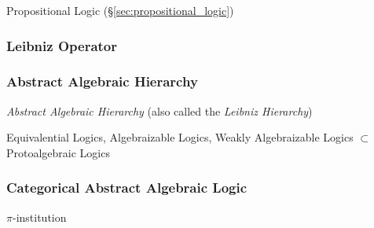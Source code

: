 Propositional Logic (\S\ref{sec:propositional_logic})



\subsubsection{Leibniz Operator}\label{sec:leibniz_operator}

\subsubsection{Abstract Algebraic Hierarchy}\label{sec:leibniz_hierarchy}

\emph{Abstract Algebraic Hierarchy} (also called the \emph{Leibniz
  Hierarchy})

Equivalential Logics, Algebraizable Logics, Weakly Algebraizable
Logics $\subset$ Protoalgebraic Logics



\subsubsection{Categorical Abstract Algebraic Logic}
\label{sec:categorical_abstract}

$\pi$-institution
